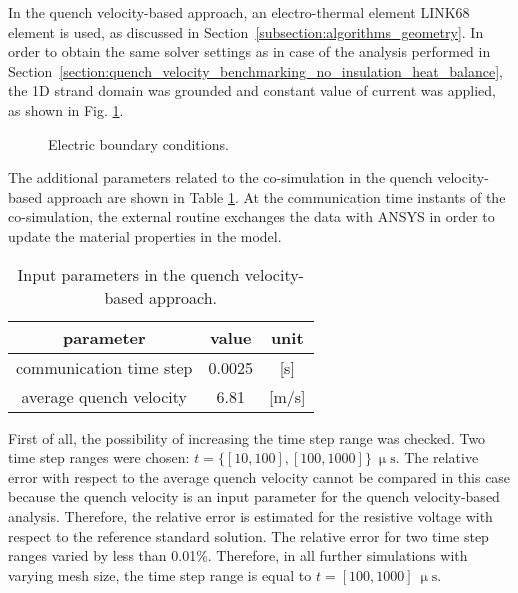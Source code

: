 
In the quench velocity-based approach, an electro-thermal element LINK68 element is used, as discussed in Section~\ref{subsection:algorithms_geometry}. In order to obtain the same solver settings as in case of the analysis performed in Section~\ref{section:quench_velocity_benchmarking_no_insulation_heat_balance}, the 1D strand domain was grounded and constant value of current was applied, as shown in Fig. \ref{fig: q_vel_benchmarking_electrical_settings}.

\begin{figure}[H]
\centering
{}
\caption{Electric boundary conditions.}
\label{fig: q_vel_benchmarking_electrical_settings}
\end{figure}

The additional parameters related to the co-simulation in the quench velocity-based approach are shown in Table \ref{table: 1d_qv_benchmarking_geometry_parameters_quench_velocity}. At the communication time instants of the co-simulation, the external routine exchanges the data with ANSYS in order to update the material properties in the model. 

\begin{table}[H]
    \caption{Input parameters in the quench velocity-based approach.} 
    \vspace{-1.em} 
    \fontsize{10}{10}
    \selectfont 
    \renewcommand{\arraystretch}{1.5}
    \begin{center}
        \begin{tabular}{ ccc }  
        \hline
        parameter & value & unit \\
        \hline
        communication time step & 0.0025 & [s] \\
        average quench velocity & 6.81 & [m/s] \\
        \hline 
        \end{tabular}
    \end{center}  
     \label{table: 1d_qv_benchmarking_geometry_parameters_quench_velocity} 
 \end{table}

First of all, the possibility of increasing the time step range was checked. Two time step ranges were chosen: $t=\{[10, 100], [100, 1000]\}~\upmu \text{s}$. The relative error with respect to the average quench velocity cannot be compared in this case because the quench velocity is an input parameter for the quench velocity-based analysis. Therefore, the relative error is estimated for the resistive voltage with respect to the reference standard solution. The relative error for two time step ranges varied by less than 0.01\%. Therefore, in all further simulations with varying mesh size, the time step range is equal to $t=[100, 1000]~\upmu \text{s}$.

